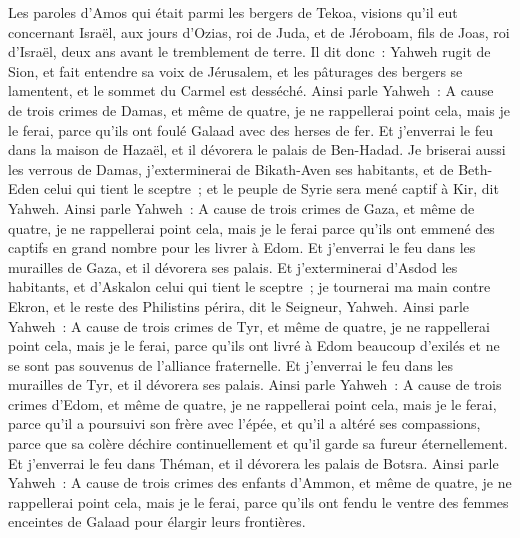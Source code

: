 \begin{multicols}{2}
\VerseOne{}Les paroles d'Amos qui était parmi les bergers de Tekoa, visions qu'il eut concernant Israël, aux jours d'Ozias, roi de Juda, et de Jéroboam, fils de Joas, roi d'Israël, deux ans avant le tremblement de terre.
Il dit donc~: Yahweh rugit de Sion, et fait entendre sa voix de Jérusalem, et les pâturages des bergers se lamentent, et le sommet du Carmel est desséché.
Ainsi parle Yahweh~: A cause de trois crimes de Damas, et même de quatre, je ne rappellerai point cela, mais je le ferai, parce qu'ils ont foulé Galaad avec des herses de fer.
Et j'enverrai le feu dans la maison de Hazaël, et il dévorera le palais de Ben-Hadad.
Je briserai aussi les verrous de Damas, j'exterminerai de Bikath-Aven ses habitants, et de Beth-Eden celui qui tient le sceptre~; et le peuple de Syrie sera mené captif à Kir, dit Yahweh.
Ainsi parle Yahweh~: A cause de trois crimes de Gaza, et même de quatre, je ne rappellerai point cela, mais je le ferai parce qu'ils ont emmené des captifs en grand nombre pour les livrer à Edom.
Et j'enverrai le feu dans les murailles de Gaza, et il dévorera ses palais.
Et j'exterminerai d'Asdod les habitants, et d'Askalon celui qui tient le sceptre~; je tournerai ma main contre Ekron, et le reste des Philistins périra, dit le Seigneur, Yahweh.
Ainsi parle Yahweh~: A cause de trois crimes de Tyr, et même de quatre, je ne rappellerai point cela, mais je le ferai, parce qu'ils ont livré à Edom beaucoup d'exilés et ne se sont pas souvenus de l'alliance fraternelle.
Et j'enverrai le feu dans les murailles de Tyr, et il dévorera ses palais.
Ainsi parle Yahweh~: A cause de trois crimes d'Edom, et même de quatre, je ne rappellerai point cela, mais je le ferai, parce qu'il a poursuivi son frère avec l'épée, et qu'il a altéré ses compassions, parce que sa colère déchire continuellement et qu'il garde sa fureur éternellement.
Et j'enverrai le feu dans Théman, et il dévorera les palais de Botsra.
Ainsi parle Yahweh~: A cause de trois crimes des enfants d'Ammon, et même de quatre, je ne rappellerai point cela, mais je le ferai, parce qu'ils ont fendu le ventre des femmes enceintes de Galaad pour élargir leurs frontières.

\end{multicols}
